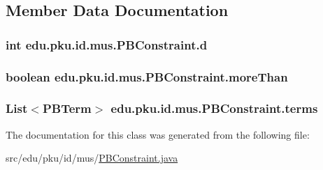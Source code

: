 \subsection{Member Data Documentation}
\hypertarget{classedu_1_1pku_1_1id_1_1mus_1_1_p_b_constraint_aba05cbcec0b67e25174fe0cfbf54e121}{
\subsubsection[{d}]{\setlength{\rightskip}{0pt plus 5cm}int {\bf edu.pku.id.mus.PBConstraint.d}}}
\label{classedu_1_1pku_1_1id_1_1mus_1_1_p_b_constraint_aba05cbcec0b67e25174fe0cfbf54e121}
\hypertarget{classedu_1_1pku_1_1id_1_1mus_1_1_p_b_constraint_a0a1a9567c235d67ba178e32e5553895f}{
\subsubsection[{moreThan}]{\setlength{\rightskip}{0pt plus 5cm}boolean {\bf edu.pku.id.mus.PBConstraint.moreThan}}}
\label{classedu_1_1pku_1_1id_1_1mus_1_1_p_b_constraint_a0a1a9567c235d67ba178e32e5553895f}
\hypertarget{classedu_1_1pku_1_1id_1_1mus_1_1_p_b_constraint_a03ef1c0dde40527ca29e6dbee8681c32}{
\subsubsection[{terms}]{\setlength{\rightskip}{0pt plus 5cm}List$<${\bf PBTerm}$>$ {\bf edu.pku.id.mus.PBConstraint.terms}}}
\label{classedu_1_1pku_1_1id_1_1mus_1_1_p_b_constraint_a03ef1c0dde40527ca29e6dbee8681c32}


The documentation for this class was generated from the following file:\begin{DoxyCompactItemize}
\item 
src/edu/pku/id/mus/\hyperlink{_p_b_constraint_8java}{PBConstraint.java}\end{DoxyCompactItemize}
